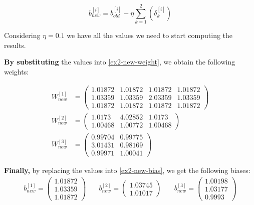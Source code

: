 \documentclass[12pt]{article}
\begin{document}
\begin{enumerate}[leftmargin=\labelsep]
          \begin{equation}\label{ex2-new-bias}
            b^{[i]}_{new} = b^{[i]}_{old} - \eta \sum_{k=1}^{2}\left(\delta_k^{[i]}\right)
          \end{equation}

          Considering $\eta = 0.1$ we have all the values we need to start computing the results.

          \textbf{By substituting} the values into \eqref{ex2-new-weight}, we obtain the following weights:

          \begin{align*}
            W^{[1]}_{new} &= \begin{pmatrix} 1.01872 & 1.01872 & 1.01872 & 1.01872 \\ 1.03359 & 1.03359 & 2.03359 & 1.03359 \\ 1.01872 & 1.01872 & 1.01872 & 1.01872 \end{pmatrix} \\
            W^{[2]}_{new} &= \begin{pmatrix} 1.0173 & 4.02852 & 1.0173 \\ 1.00468 & 1.00772 & 1.00468\end{pmatrix} \\
            W^{[3]}_{new} &= \begin{pmatrix} 0.99704 & 0.99775 \\ 3.01431 & 0.98169 \\ 0.99971 & 1.00041\end{pmatrix}
          \end{align*}

          \textbf{Finally,} by replacing the values into \eqref{ex2-new-bias}, we get the following biases:
          \[
              \begin{array}{ccc}
                  b^{[1]}_{new} = \begin{pmatrix} 1.01872 \\ 1.03359 \\ 1.01872\end{pmatrix} & \quad
                  b^{[2]}_{new} = \begin{pmatrix} 1.03745 \\ 1.01017\end{pmatrix} & \quad
                  b^{[3]}_{new} = \begin{pmatrix} 1.00198 \\ 1.03177 \\ 0.9993\end{pmatrix}
              \end{array}
          \]
\end{enumerate}
\end{document}

